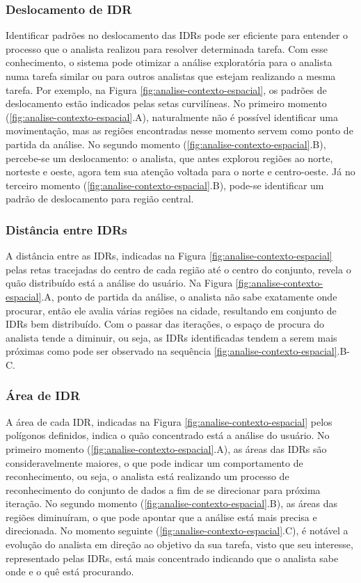 \subsubsection{Deslocamento de IDR}

Identificar padrões no deslocamento das IDRs pode ser eficiente para entender o processo que o analista realizou para resolver determinada tarefa. Com esse conhecimento, o sistema pode otimizar a análise exploratória para o analista numa tarefa similar ou para outros analistas que estejam realizando a mesma tarefa. Por exemplo, na Figura \ref{fig:analise-contexto-espacial}, os padrões de deslocamento estão indicados pelas setas curvilíneas. No primeiro momento (\ref{fig:analise-contexto-espacial}.A), naturalmente não é possível identificar uma movimentação, mas as regiões encontradas nesse momento servem como ponto de partida da análise. No segundo momento (\ref{fig:analise-contexto-espacial}.B), percebe-se um deslocamento: o analista, que antes explorou regiões ao norte, norteste e oeste, agora tem sua atenção voltada para o norte e centro-oeste. Já no terceiro momento (\ref{fig:analise-contexto-espacial}.B), pode-se identificar um padrão de deslocamento para região central.

\subsubsection{Distância entre IDRs}

A distância entre as IDRs, indicadas na Figura \ref{fig:analise-contexto-espacial} pelas retas tracejadas do centro de cada região até o centro do conjunto, revela o quão distribuído está a análise do usuário. Na Figura \ref{fig:analise-contexto-espacial}.A, ponto de partida da análise, o analista não sabe exatamente onde procurar, então ele avalia várias regiões na cidade, resultando em conjunto de IDRs bem distribuído. Com o passar das iterações, o espaço de procura do analista tende a diminuir, ou seja, as IDRs identificadas tendem a serem mais próximas como pode ser observado na sequência \ref{fig:analise-contexto-espacial}.B-C.

\subsubsection{Área de IDR}

A área de cada IDR, indicadas na Figura \ref{fig:analise-contexto-espacial} pelos polígonos definidos, indica o quão concentrado está a análise do usuário. No primeiro momento (\ref{fig:analise-contexto-espacial}.A), as áreas das IDRs são consideravelmente maiores, o que pode indicar um comportamento de reconhecimento, ou seja, o analista está realizando um processo de reconhecimento do conjunto de dados a fim de se direcionar para próxima iteração. No segundo momento (\ref{fig:analise-contexto-espacial}.B), as áreas das regiões diminuíram, o que pode apontar que a análise está mais precisa e direcionada. No momento seguinte (\ref{fig:analise-contexto-espacial}.C), é notável a evolução do analista em direção ao objetivo da sua tarefa, visto que seu interesse, representado pelas IDRs, está mais concentrado indicando que o analista sabe onde e o quê está procurando.

